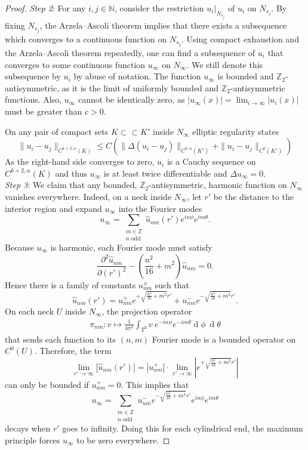 \documentclass[preprint,12pt]{elsarticle}
\numberwithin{table}{section}
\newcommand{\Z}{\mathbb{Z}}
\newcommand{\N}{\mathbb{N}}
\newcommand{\del}{\partial}
\renewcommand{\d}{\operatorname{d}\!}
\begin{document}
\begin{proof}
	\noindent
	\textit{Step 2}: For any $i,j \in \N$, consider the restriction $u_i|_{N_{s_j}}$ of $u_i$ on $N_{s_j}$. By fixing $N_{s_j}$, the Arzela--Ascoli theorem implies that there exists a subsequence which converges to a continuous function on $N_{s_j}$. Using compact exhaustion and the Arzela--Ascoli theorem repeatedly, one can find a subsequence of $u_i$ that converges to some continuous function $u_\infty$ on $N_\infty$. We still denote this subsequence by $u_i$ by abuse of notation.
	The function $u_\infty$ is bounded and $\Z_2$-antisymmetric, as it is the limit of uniformly bounded and $\Z_2$-antisymmetric functions. Also, $u_\infty$ cannot be identically zero, as 
	$|u_\infty(x)| = \lim_{i \to \infty} |u_i(x)|$ must be greater than $c > 0$.
	
	On any pair of compact sets $K \subset \subset K'$ inside $N_\infty$ elliptic regularity states
	$$
	\| u_i - u_j \|_{C^{k+2, \alpha}(K)} \le C \left(
		\| \Delta(u_i - u_j) \|_{C^{k, \alpha}(K')} + \| u_i - u_j \|_{C^{0}(K')}
	\right)
	$$
	As the right-hand side converges to zero, $u_i$ is a Cauchy sequence on $C^{k+2, \alpha}(K)$ and thus $u_\infty$ is at least twice differentiable and $\Delta u_\infty= 0$.
	\\

	\noindent
	\textit{Step 3}: We claim that any bounded, $\Z_2$-antisymmetric, harmonic function on $N_\infty$ vanishes everywhere. Indeed, on a neck inside $N_\infty$, let $r'$ be the distance to the interior region and expand $u_\infty$ into the Fourier modes
	\begin{equation}
        \label{eq:expansion-fourier-modes-1}
        u_\infty = \sum_{\substack{m \in \Z \\ n \text{ odd}}} \hat{u}_{nm}(r') e^{in \phi} e^{im \theta}.
    \end{equation}
	Because $u_\infty$ is harmonic, each Fourier mode must satisfy $$\frac{\del^2 \hat{u}_{nm}}{\del (r')^2} - \left(\frac{n^2}{16} + m^2\right) \hat{u}_{nm} = 0.$$
	Hence there is a family of constants $u^\pm_{nm}$ such that $$\hat{u}_{nm} (r') = u^+_{nm} e^{+ \sqrt{\frac{n^2}{16} + m^2} r'} + u^-_{nm} e^{- \sqrt{\frac{n^2}{16} + m^2} r'}.$$ On each neck $U$ inside $N_\infty$, the projection operator 
	\begin{align}
		\pi_{nm}\colon v \mapsto \frac{1}{4 \pi^2} \int_{T^2}v \: e^{-in \phi} e^{- im \theta}  \d \phi\: \d \theta
	\end{align}
	that sends each function to its $(n,m)$ Fourier mode is a bounded operator on $C^0(U)$. Therefore, the term
	$$
	\lim\limits_{r' \to \infty} |\hat{u}_{nm}(r')| = |u^+_{nm}| \cdot \lim\limits_{r' \to \infty} | e^{+ \sqrt{\frac{n^2}{16} + m^2} r'} |
	$$
	can only be bounded if $u^+_{nm} = 0$. This implies that $$u_\infty = \sum_{\substack{m \in \Z \\ n \text{ odd}}} u^-_{nm} e^{- \sqrt{\frac{n^2}{16} + m^2} r'} e^{in \phi} e^{im \theta}$$ decays when $r'$ goes to infinity. Doing this for each cylindrical end, the maximum principle forces $u_\infty$ to be zero everywhere.
	

\end{proof}
\end{document}
